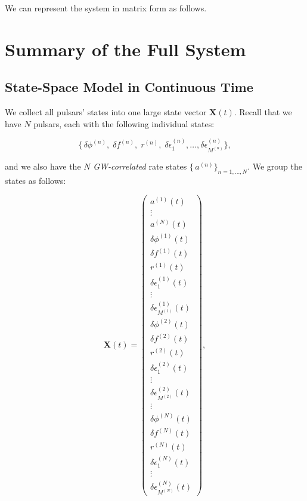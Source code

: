 \documentclass[]{scrartcl}
\begin{document}
We can represent the system in matrix form as follows.

\section{Summary of the Full System}

\subsection{State-Space Model in Continuous Time}

We collect all pulsars' states into one large state vector $\mathbf{X}(t)$. Recall that we have $N$ pulsars, each with the following individual states:

\begin{equation}
\bigl\{\,\delta\phi^{(n)},\;\delta f^{(n)},\;r^{(n)},\;\delta \epsilon_{1}^{(n)},\ldots,\delta \epsilon_{M^{(n)}}^{(n)}\bigr\},
\end{equation}

and we also have the $N$ \emph{GW-correlated} rate states $\{\,a^{(n)}\}_{n=1,\ldots,N}$. We group the states as follows:

\begin{equation}
\mathbf{X}(t)
=
\begin{pmatrix}
a^{(1)}(t)\\
\vdots\\
a^{(N)}(t)\\[6pt]
\delta\phi^{(1)}(t)\\
\delta f^{(1)}(t)\\
r^{(1)}(t)\\
\delta \epsilon_{1}^{(1)}(t)\\
\vdots \\
\delta \epsilon_{M^{(1)}}^{(1)}(t)\\[3pt]
\delta\phi^{(2)}(t)\\
\delta f^{(2)}(t)\\
r^{(2)}(t)\\
\delta \epsilon_{1}^{(2)}(t)\\
\vdots \\
\delta \epsilon_{M^{(2)}}^{(2)}(t)\\
\vdots \\[3pt]
\delta\phi^{(N)}(t)\\
\delta f^{(N)}(t)\\
r^{(N)}(t)\\
\delta \epsilon_{1}^{(N)}(t)\\
\vdots\\
\delta \epsilon_{M^{(N)}}^{(N)}(t)
\end{pmatrix},
\end{equation}
\end{document}
